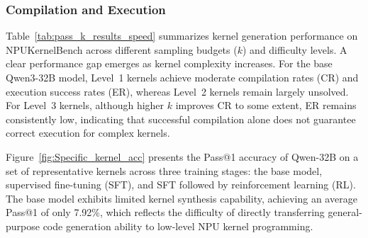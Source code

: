 \subsubsection{Compilation and Execution}

Table~\ref{tab:pass_k_results_speed} summarizes kernel generation performance on NPUKernelBench across different sampling budgets ($k$) and difficulty levels.
A clear performance gap emerges as kernel complexity increases.
For the base Qwen3-32B model, Level~1 kernels achieve moderate compilation rates (CR) and execution success rates (ER), whereas Level~2 kernels remain largely unsolved.
For Level~3 kernels, although higher $k$ improves CR to some extent, ER remains consistently low, indicating that successful compilation alone does not guarantee correct execution for complex kernels.

Figure~\ref{fig:Specific_kernel_acc} presents the Pass@1 accuracy of Qwen-32B on a set of representative kernels across three training stages: the base model, supervised fine-tuning (SFT), and SFT followed by reinforcement learning (RL).
The base model exhibits limited kernel synthesis capability, achieving an average Pass@1 of only 7.92\%, which reflects the difficulty of directly transferring general-purpose code generation ability to low-level NPU kernel programming.

